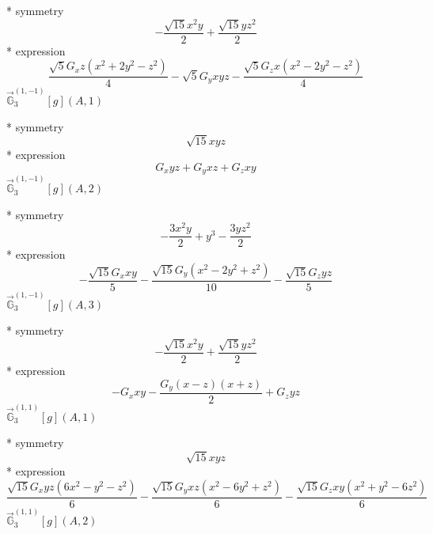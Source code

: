 \documentclass[fleqn,8pt]{jsarticle}
\begin{document}
\noindent\quad ** symmetry
\begin{dmath*}
- \frac{\sqrt{15} x^{2} y}{2} + \frac{\sqrt{15} y z^{2}}{2}
\end{dmath*}
\noindent\quad ** expression
\begin{dmath*}
\frac{\sqrt{5} G_{x} z \left(x^{2} + 2 y^{2} - z^{2}\right)}{4} - \sqrt{5} G_{y} x y z - \frac{\sqrt{5} G_{z} x \left(x^{2} - 2 y^{2} - z^{2}\right)}{4}
\end{dmath*}
\noindent\quad $\vec{\mathbb{G}}_{3}^{(1,-1)}[g](A,1)$

\noindent\quad ** symmetry
\begin{dmath*}
\sqrt{15} x y z
\end{dmath*}
\noindent\quad ** expression
\begin{dmath*}
G_{x} y z + G_{y} x z + G_{z} x y
\end{dmath*}
\noindent\quad $\vec{\mathbb{G}}_{3}^{(1,-1)}[g](A,2)$

\noindent\quad ** symmetry
\begin{dmath*}
- \frac{3 x^{2} y}{2} + y^{3} - \frac{3 y z^{2}}{2}
\end{dmath*}
\noindent\quad ** expression
\begin{dmath*}
- \frac{\sqrt{15} G_{x} x y}{5} - \frac{\sqrt{15} G_{y} \left(x^{2} - 2 y^{2} + z^{2}\right)}{10} - \frac{\sqrt{15} G_{z} y z}{5}
\end{dmath*}
\noindent\quad $\vec{\mathbb{G}}_{3}^{(1,-1)}[g](A,3)$

\noindent\quad ** symmetry
\begin{dmath*}
- \frac{\sqrt{15} x^{2} y}{2} + \frac{\sqrt{15} y z^{2}}{2}
\end{dmath*}
\noindent\quad ** expression
\begin{dmath*}
- G_{x} x y - \frac{G_{y} \left(x - z\right) \left(x + z\right)}{2} + G_{z} y z
\end{dmath*}
\noindent\quad $\vec{\mathbb{G}}_{3}^{(1,1)}[g](A,1)$

\noindent\quad ** symmetry
\begin{dmath*}
\sqrt{15} x y z
\end{dmath*}
\noindent\quad ** expression
\begin{dmath*}
\frac{\sqrt{15} G_{x} y z \left(6 x^{2} - y^{2} - z^{2}\right)}{6} - \frac{\sqrt{15} G_{y} x z \left(x^{2} - 6 y^{2} + z^{2}\right)}{6} - \frac{\sqrt{15} G_{z} x y \left(x^{2} + y^{2} - 6 z^{2}\right)}{6}
\end{dmath*}
\noindent\quad $\vec{\mathbb{G}}_{3}^{(1,1)}[g](A,2)$
\end{document}
